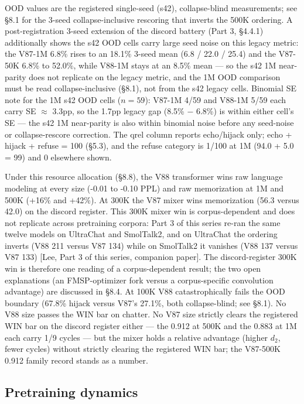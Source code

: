 \documentclass[11pt]{article}
\begin{document}
\textdagger{} OOD values are the registered single-seed (s42), collapse-blind measurements; see \S8.1 for the 3-seed collapse-inclusive rescoring that inverts the 500K ordering. A post-registration 3-seed extension of the discord battery (Part 3, \S4.4.1) additionally shows the s42 OOD cells carry large seed noise on this legacy metric: the V87-1M 6.8\% rises to an 18.1\% 3-seed mean (6.8 / 22.0 / 25.4) and the V87-50K 6.8\% to 52.0\%, while V88-1M stays at an 8.5\% mean --- so the s42 1M near-parity does not replicate on the legacy metric, and the 1M OOD comparison must be read collapse-inclusive (\S8.1), not from the s42 legacy cells. Binomial SE note for the 1M s42 OOD cells ($n=59$): V87-1M 4/59 and V88-1M 5/59 each carry SE $\approx$ 3.3pp, so the 1.7pp legacy gap (8.5\% $-$ 6.8\%) is within either cell's SE --- the s42 1M near-parity is also within binomial noise before any seed-noise or collapse-rescore correction. The qrel column reports echo/hijack only; echo + hijack + refuse = 100 (\S5.3), and the refuse category is 1/100 at 1M (94.0 + 5.0 = 99) and 0 elsewhere shown.

Under this resource allocation (\S8.8), the V88 transformer wins raw language modeling at every size (-0.01 to -0.10 PPL) and raw memorization at 1M and 500K (+16\% and +42\%). At 300K the V87 mixer wins memorization (56.3 versus 42.0) on the discord register. This 300K mixer win is corpus-dependent and does not replicate across pretraining corpora: Part 3 of this series re-ran the same twelve models on UltraChat and SmolTalk2, and on UltraChat the ordering inverts (V88 211 versus V87 134) while on SmolTalk2 it vanishes (V88 137 versus V87 133) [Lee, Part 3 of this series, companion paper]. The discord-register 300K win is therefore one reading of a corpus-dependent result; the two open explanations (an FMSP-optimizer fork versus a corpus-specific convolution advantage) are discussed in \S8.4. At 100K V88 catastrophically fails the OOD boundary (67.8\% hijack versus V87's 27.1\%, both collapse-blind; see \S8.1). No V88 size passes the WIN bar on chatter. No V87 size strictly clears the registered WIN bar on the discord register either --- the 0.912 at 500K and the 0.883 at 1M each carry 1/9 cycles --- but the mixer holds a relative advantage (higher $d_2$, fewer cycles) without strictly clearing the registered WIN bar; the V87-500K 0.912 family record stands as a number.

\subsection{Pretraining dynamics}
\end{document}
